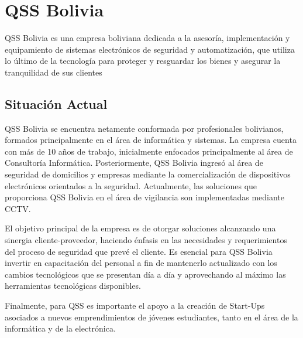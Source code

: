 \section{QSS Bolivia}
        QSS Bolivia es una empresa boliviana dedicada a la asesoría, implementación y equipamiento de sistemas electrónicos de seguridad y automatización, que utiliza lo último de la tecnología para proteger y resguardar los bienes y asegurar la tranquilidad de sus clientes \parencite{QSSBolvia2016-el}
        \subsection{Situación Actual}
            QSS Bolivia se encuentra netamente conformada por profesionales bolivianos, formados principalmente en el área de informática y sistemas. La empresa cuenta con más de 10 años de trabajo, inicialmente enfocados principalmente al área de Consultoría Informática. Posteriormente, QSS Bolivia ingresó al área de seguridad de domicilios y empresas mediante la comercialización de dispositivos electrónicos orientados a la seguridad.
            Actualmente, las soluciones que proporciona QSS Bolivia en el área de vigilancia son implementadas mediante CCTV.
            
            El objetivo principal de la empresa es de otorgar soluciones alcanzando una sinergia cliente-proveedor, haciendo énfasis en las necesidades y requerimientos del proceso de seguridad que prevé el cliente.  
            Es esencial para QSS Bolivia invertir en capacitación del personal a fin de mantenerlo actualizado con los cambios tecnológicos que se presentan día a día y aprovechando al máximo las herramientas tecnológicas disponibles. 
            
            Finalmente, para QSS es importante el apoyo a la creación de Start-Ups asociados a nuevos emprendimientos de jóvenes estudiantes, tanto en el área de la informática y de la electrónica.
    